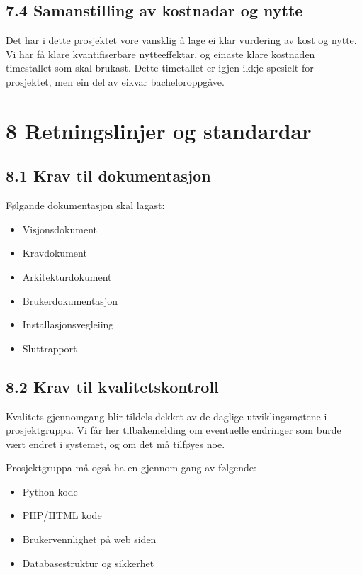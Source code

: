 \documentclass[12pt]{article}
\begin{document}
\subsection{7.4 Samanstilling av kostnadar og nytte}

Det har i dette prosjektet vore vansklig å lage ei klar vurdering av kost og nytte. Vi har få klare kvantifiserbare nytteeffektar, og einaste klare kostnaden timestallet som skal brukast. Dette timetallet er igjen ikkje spesielt for prosjektet, men ein del av eikvar bacheloroppgåve. 

\section{8 Retningslinjer og standardar}

\subsection{8.1 Krav til dokumentasjon}

Følgande dokumentasjon skal lagast:

\begin{itemize}
\item Visjonsdokument
\item Kravdokument
\item Arkitekturdokument
\item Brukerdokumentasjon
\item Installasjonsvegleiing
\item Sluttrapport
\end{itemize}
\subsection{8.2 Krav til kvalitetskontroll}

Kvalitets gjennomgang blir tildels dekket av de daglige utviklingsmøtene i prosjektgruppa. Vi får her tilbakemelding om eventuelle endringer som burde vært endret i systemet, og om det må tilføyes noe. 




Prosjektgruppa må også ha en gjennom gang av følgende:

\begin{itemize}
\item Python kode
\item PHP/HTML kode
\item Brukervennlighet på web siden
\item Databasestruktur og sikkerhet
\end{itemize}
\end{document}
